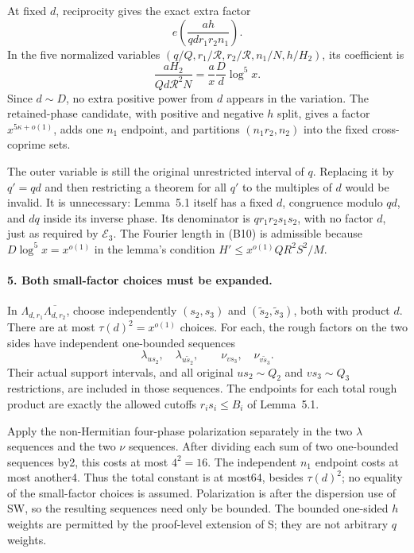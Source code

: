 At fixed $d$, reciprocity gives the exact extra factor
\[
 e\!\left(\frac{ah}{qdr_1r_2n_1}\right).                 \tag{B13}
\]
In the five normalized variables $(q/Q,r_1/\mathcal R,
r_2/\mathcal R,n_1/N,h/H_2)$, its coefficient is
\[
 \frac{aH_2}{Qd\mathcal R^2N}
 =\frac ax\frac Dd\log^5x.
\]
Since $d\sim D$, no extra positive power from $d$ appears in the
variation. The retained-phase candidate, with positive and negative
$h$ split, gives a factor
$x^{5\kappa+o(1)}$, adds one $n_1$ endpoint, and partitions
$(n_1r_2,n_2)$ into the fixed cross-coprime sets.

The outer variable is still the original unrestricted interval of
$q$. Replacing it by $q'=qd$ and then restricting a theorem for all
$q'$ to the multiples of $d$ would be invalid. It is unnecessary:
Lemma~5.1 itself has a fixed $d$, congruence modulo $qd$, and $dq$
inside its inverse phase. Its denominator is $qr_1r_2s_1s_2$,
with no factor $d$, just as required by $\mathcal E_3$.
The Fourier length in (B10) is admissible because
$D\log^5x=x^{o(1)}$ in the lemma's condition
$H'\le x^{o(1)}QR^2S^2/M$.

\paragraph{5. Both small-factor choices must be expanded.}
In $\Lambda_{d,r_1}\overline{\Lambda_{d,r_2}}$, choose independently
$(s_2,s_3)$ and $(\widetilde s_2,\widetilde s_3)$, both with product
$d$. There are at most $\tau(d)^2=x^{o(1)}$ choices. For each,
the rough factors on the two sides have independent one-bounded
sequences
\[
 \lambda_{us_2},\quad\lambda_{u\widetilde s_2},\qquad
 \nu_{vs_3},\quad\nu_{v\widetilde s_3}.
\]
Their actual support intervals, and all original $us_2\sim Q_2$
and $vs_3\sim Q_3$ restrictions, are included in those sequences.
The endpoints for each total rough product are exactly the allowed
cutoffs $r_is_i\le B_i$ of Lemma~5.1.

Apply the non-Hermitian four-phase polarization separately in the
two $\lambda$ sequences and the two $\nu$ sequences. After dividing
each sum of two one-bounded sequences by2, this costs at most
$4^2=16$. The independent $n_1$ endpoint costs at most another4.
Thus the total constant is at most64, besides $\tau(d)^2$; no equality
of the small-factor choices is assumed. Polarization is after the
dispersion use of SW, so the resulting sequences need only be bounded.
The bounded one-sided $h$ weights are permitted by the proof-level
extension of S; they are not arbitrary $q$ weights.

